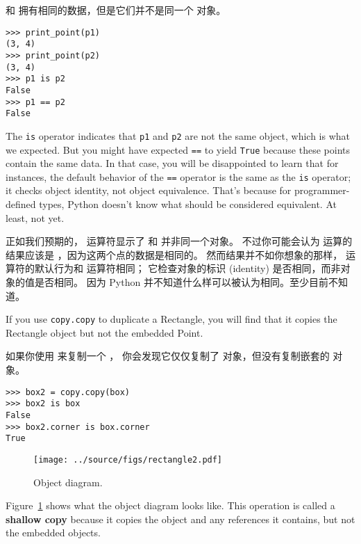  和  拥有相同的数据，但是它们并不是同一个  对象。

\begin{lstlisting}
>>> print_point(p1)
(3, 4)
>>> print_point(p2)
(3, 4)
>>> p1 is p2
False
>>> p1 == p2
False
\end{lstlisting}

%
The {\tt is} operator indicates that {\tt p1} and {\tt p2} are not the
same object, which is what we expected.  But you might have expected
{\tt ==} to yield {\tt True} because these points contain the same
data.  In that case, you will be disappointed to learn that for
instances, the default behavior of the {\tt ==} operator is the same
as the {\tt is} operator; it checks object identity, not object
equivalence.  That's because for programmer-defined types, Python doesn't
know what should be considered equivalent.  At least, not yet.

正如我们预期的，  运算符显示了  和  并非同一个对象。
不过你可能会认为 \li{==} 运算的结果应该是  ，因为这两个点的数据是相同的。
然而结果并不如你想象的那样， \li{==} 运算符的默认行为和  运算符相同；
它检查对象的标识 (identity) 是否相同，而非对象的值是否相同。  因为 Python 并不知道什么样可以被认为相同。至少目前不知道。
  
  

If you use {\tt copy.copy} to duplicate a Rectangle, you will find
that it copies the Rectangle object but not the embedded Point.

如果你使用  来复制一个  ，
你会发现它仅仅复制了  对象，但没有复制嵌套的  对象。

\begin{lstlisting}
>>> box2 = copy.copy(box)
>>> box2 is box
False
>>> box2.corner is box.corner
True
\end{lstlisting}

\begin{figure}
\centerline
{\texttt{[image: ../source/figs/rectangle2.pdf]}}
\caption{Object diagram.}
\label{fig.rectangle2}
\end{figure}

Figure~\ref{fig.rectangle2} shows what the object diagram looks like.
  
  
This operation is called a {\bf shallow copy} because it copies the
object and any references it contains, but not the embedded objects.
  

